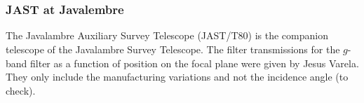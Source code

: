 \documentclass[11pt]{article}
\begin{document}
    \begin{center}
    \end{center}
    { \hspace*{\fill} \\}
    
    \begin{center}
    \end{center}
    { \hspace*{\fill} \\}
    
    \subsubsection{JAST at Javalembre}\label{jast-at-javalembre}

The Javalambre Auxiliary Survey Telescope (JAST/T80) is the companion
telescope of the Javalambre Survey Telescope. The filter transmissions
for the \(g\)-band filter as a function of position on the focal plane
were given by Jesus Varela. They only include the manufacturing
variations and not the incidence angle (to check).
\end{document}
